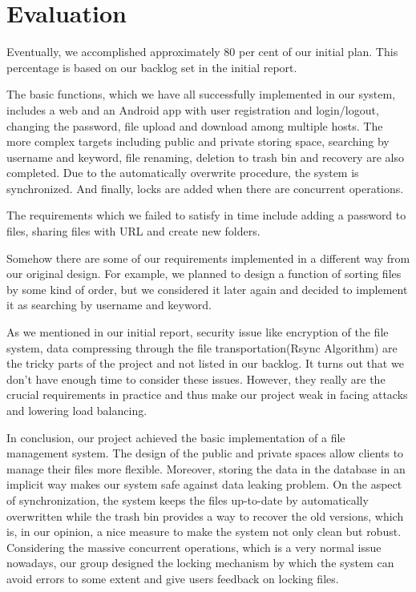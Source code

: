 \documentclass[a4paper,11pt]{article}
\begin{document}
\section{Evaluation}
Eventually, we accomplished approximately 80 per cent of our initial plan. This percentage is based on our backlog set in the initial report. 
\par The basic functions, which we have all successfully implemented in our system, includes a web and an Android app with user registration and login/logout, changing the password, file upload and download among multiple hosts. The more complex targets including public and private storing space, searching by username and keyword, file renaming, deletion to trash bin and recovery are also completed. Due to the automatically overwrite procedure, the system is synchronized. And finally, locks are added when there are concurrent operations.
\par The requirements which we failed to satisfy in time include adding a password to files, sharing files with URL and create new folders.
\par Somehow there are some of our requirements implemented in a different way from our original design. For example, we planned to design a function of sorting files by some kind of order, but we considered it later again and decided to implement it as searching by username and keyword.
\par As we mentioned in our initial report, security issue like encryption of the file system, data compressing through the file transportation(Rsync Algorithm) are the tricky parts of the project and not listed in our backlog. It turns out that we don't have enough time to consider these issues. However, they really are the crucial requirements in practice and thus make our project weak in facing attacks and lowering load balancing.
\par In conclusion, our project achieved the basic implementation of a file management system. The design of the public and private spaces allow clients to manage their files more flexible. Moreover, storing the data in the database in an implicit way makes our system safe against data leaking problem. On the aspect of synchronization, the system keeps the files up-to-date by automatically overwritten while the trash bin provides a way to recover the old versions, which is, in our opinion, a nice measure to make the system not only clean but robust. Considering the massive concurrent operations, which is a very normal issue nowadays, our group designed the locking mechanism by which the system can avoid errors to some extent and give users feedback on locking files. 
\end{document}
